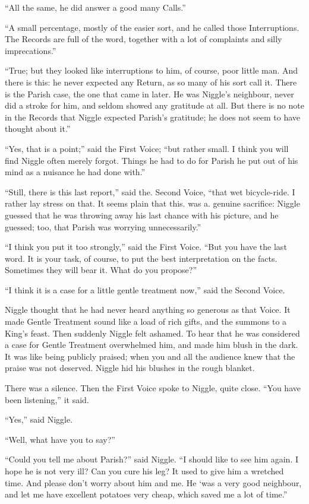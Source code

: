 \documentclass[english]{scrartcl}
\begin{document}
“All the same, he did answer a good many Calls.”

“A small percentage, mostly of the easier sort, and he called those Interruptions. The Records are full of the word, together with a lot of complaints and silly imprecations.”

“True; but they looked like interruptions to him, of course, poor little man. And there is this: he never expected any Return, as so many of his sort call it. There is the Parish case, the one that came in later. He was Niggle’s neighbour, never did a stroke for him, and seldom showed any gratitude at all. But there is no note in the Records that Niggle expected Parish’s gratitude; he does not seem to have thought about it.”

“Yes, that is a point;” said the First Voice; “but rather small. I think you will find Niggle often merely forgot. Things he had to do for Parish he put out of his mind as a nuisance he had done with.”

“Still, there is this last report,” said the. Second Voice, “that wet bicycle-ride. I rather lay stress on that. It seems plain that this. was a. genuine sacrifice: Niggle guessed that he was throwing away his last chance with his picture, and he guessed; too, that Parish was worrying unnecessarily.”

“I think you put it too strongly,” said the First Voice. “But you have the last word. It is your task, of course, to put the best interpretation on the facts. Sometimes they will bear it. What do you propose?”

“I think it is a case for a little gentle treatment now,” said the Second Voice.

Niggle thought that he had never heard anything so generous as that Voice. It made Gentle Treatment sound like a load of rich gifts, and the summons to a King’s feast. Then suddenly Niggle felt ashamed. To hear that he was considered a case for Gentle Treatment overwhelmed him, and made him blush in the dark. It was like being publicly praised; when you and all the audience knew that the praise was not deserved. Niggle hid his blushes in the rough blanket.

There was a silence. Then the First Voice spoke to Niggle, quite close. “You have been listening,” it said.

“Yes,” said Niggle.

“Well, what have you to say?”

“Could you tell me about Parish?” said Niggle. “I should like to see him again. I hope he is not very ill? Can you cure his leg? It used to give him a wretched time. And please don’t worry about him and me. He ‘was a very good neighbour, and let me have excellent potatoes very cheap, which saved me a lot of time.”
\end{document}
